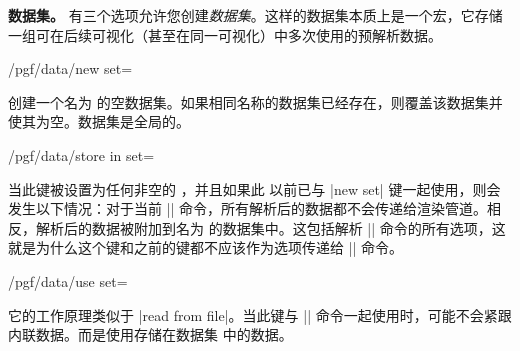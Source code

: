 \begin{command}{\pgfdata{}}
    \medskip

    \textbf{数据集。} 有三个选项允许您创建\emph{数据集}。这样的数据集本质上是一个宏，它存储一组可在后续可视化（甚至在同一可视化）中多次使用的预解析数据。
    \begin{key}{/pgf/data/new set=} %

        创建一个名为  的空数据集。如果相同名称的数据集已经存在，则覆盖该数据集并使其为空。数据集是全局的。
    \end{key}
    \begin{key}{/pgf/data/store in set=} %

        当此键被设置为任何非空的 ，并且如果此  以前已与 |new set| 键一起使用，则会发生以下情况：对于当前 |\pgfdata| 命令，所有解析后的数据都不会传递给渲染管道。相反，解析后的数据被附加到名为  的数据集中。这包括解析 |\pgfdata| 命令的所有选项，这就是为什么这个键和之前的键都不应该作为选项传递给 |\pgfdata| 命令。
    \end{key}
    \begin{key}{/pgf/data/use set=} %

        它的工作原理类似于 |read from file|。当此键与 |\pgfdata| 命令一起使用时，可能不会紧跟内联数据。而是使用存储在数据集  中的数据。
    \end{key}
\end{command}


